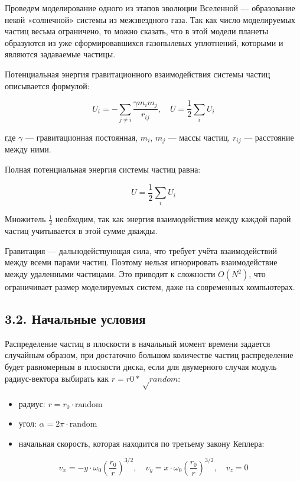 \documentclass[
  english,
  russian,
  12pt,
  a4paper,
  DIV=11,
  numbers=noendperiod]{scrreprt}
\providecommand{\tightlist}{%
  \setlength{\itemsep}{0pt}\setlength{\parskip}{0pt}}
\begin{document}
Проведем моделирование одного из этапов эволюции Вселенной ---
образование некой «солнечной» системы из межзвездного газа. Так как
число моделируемых частиц весьма ограничено, то можно сказать, что в
этой модели планеты образуются из уже сформировавшихся газопылевых
уплотнений, которыми и являются задаваемые частицы.

Потенциальная энергия гравитационного взаимодействия системы частиц
описывается формулой:

\[
U_i = -\sum_{j \neq i} \frac{\gamma m_i m_j}{r_{ij}}, \quad U = \frac{1}{2} \sum_i U_i
\]

где \(\gamma\) --- гравитационная постоянная, \(m_i\), \(m_j\) --- массы
частиц, \(r_{ij}\) --- расстояние между ними.

Полная потенциальная энергия системы частиц равна:

\[
U = \frac{1}{2} \sum_{i} U_{i} 
\]

Множитель \(\frac{1}{2}\) необходим, так как энергия взаимодействия
между каждой парой частиц учитывается в этой сумме дважды.

Гравитация --- дальнодействующая сила, что требует учёта взаимодействий
между всеми парами частиц. Поэтому нельзя игнорировать взаимодействие
между удаленными частицами. Это приводит к сложности \(O(N^2)\), что
ограничивает размер моделируемых систем, даже на современных
компьютерах.

\subsection{3.2. Начальные
условия}\label{ux43dux430ux447ux430ux43bux44cux43dux44bux435-ux443ux441ux43bux43eux432ux438ux44f}

Распределение частиц в плоскости в начальный момент времени задается
случайным образом, при достаточно большом количестве частиц
распределение будет равномерным в плоскости диска, если для двумерного
случая модуль радиус-вектора выбирать как \(r = r0*√random\):

\begin{itemize}
\tightlist
\item
  радиус: \(r = r_0 \cdot \text{random}\)
\item
  угол: \(\alpha = 2\pi \cdot \text{random}\)
\item
  начальная скорость, которая находится по третьему закону Кеплера:
\end{itemize}

\[
v_x = -y \cdot \omega_0 \left( \frac{r_0}{r} \right)^{3/2}, \quad v_y = x \cdot \omega_0 \left( \frac{r_0}{r} \right)^{3/2}, \quad v_z = 0
\]
\end{document}
